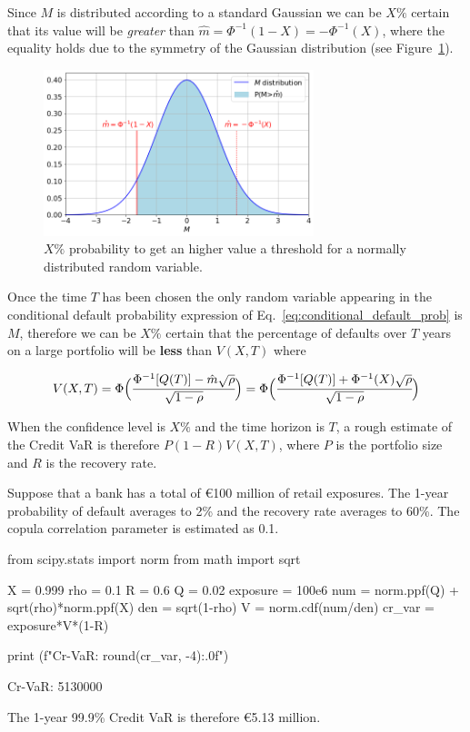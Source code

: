 Since $M$ is distributed according to a standard Gaussian we can be $X\%$ certain that its value will be \emph{greater} than $\hat{m} = \Phi^{-1}(1-X)=-\Phi^{-1}(X)$, where the equality holds due to the symmetry of the Gaussian distribution (see Figure~\ref{fig:certain_for_X}).

\begin{figure}[htb]
\centering
\includegraphics[width=0.7\textwidth]{figures/certain_for_X}
\caption{$X\%$ probability to get an higher value a threshold for a normally distributed random variable.}
\label{fig:certain_for_X}
\end{figure} 

Once the time $T$ has been chosen the only random variable appearing in the conditional default probability expression of Eq.~\ref{eq:conditional_default_prob} is $M$, therefore we can be $X\%$ certain that the percentage of defaults over $T$ years on a large portfolio will be \textbf{less} than $V(X,T)$ where

\begin{equation*}
V(X,T)= \Phi\Big(\cfrac{\Phi^{-1}[Q(T)]-\hat{m}\sqrt{\rho}}{\sqrt{1-\rho}}\Big) = \Phi\Big(\cfrac{\Phi^{-1}[Q(T)]+\Phi^{-1}(X)\sqrt{\rho}}{\sqrt{1-\rho}}\Big)
\end{equation*}

When the confidence level is $X\%$ and the time horizon is $T$, a rough estimate of the Credit VaR is therefore $P(1-R)V(X,T)$, where $P$ is the portfolio size and $R$ is the recovery rate.

Suppose that a bank has a total of \euro{100} million of retail exposures. The 1-year probability of default averages to 2\% and the recovery rate averages to 60\%. The copula correlation parameter is estimated as 0.1.

\begin{ipython}
from scipy.stats import norm
from math import sqrt

X = 0.999
rho = 0.1
R = 0.6
Q = 0.02
exposure = 100e6
num = norm.ppf(Q) + sqrt(rho)*norm.ppf(X)
den = sqrt(1-rho)
V = norm.cdf(num/den)
cr_var = exposure*V*(1-R)

print (f"Cr-VaR: {round(cr_var, -4):.0f}")
\end{ipython}
\begin{ioutput}
Cr-VaR: 5130000
\end{ioutput}
\noindent
The 1-year 99.9\% Credit VaR is therefore \euro{5.13} million.

